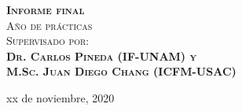 \documentclass[11pt,dvipsnames]{report} %
\newcommand{\1}{\mathds{1}}
\begin{document}
\begin{titlepage}
\textsc{{\Large\bfseries Informe final}}\\
\textsc{\large Año de prácticas}\\[2cm]

\textsc{\large Supervisado por:\\
		\textbf{Dr. Carlos Pineda (IF-UNAM) y\\
		M.Sc. Juan Diego Chang (ICFM-USAC)}}


\vfill\vfill\vfill %
\vfill\vfill\vfill

{\large xx de noviembre, 2020} %




\vfill %
\end{titlepage}

\newtheorem{definition}{Definición}[section]

\newtheorem{teorema}{Teorema}[section]
\end{document}
